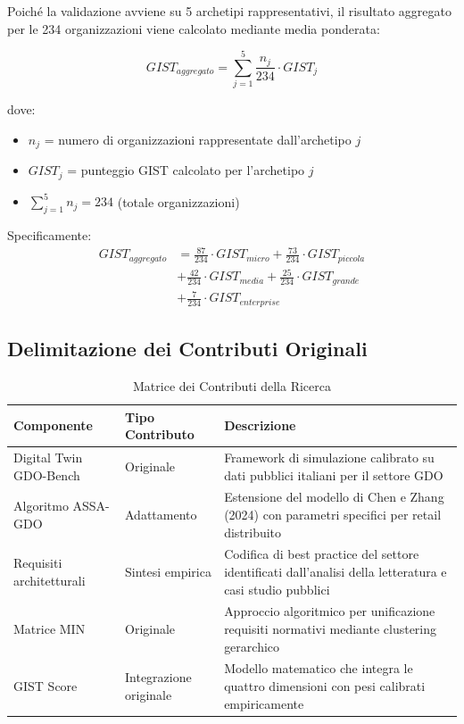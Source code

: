 Poiché la validazione avviene su 5 archetipi rappresentativi, il risultato aggregato per le 234 organizzazioni viene calcolato mediante media ponderata:

\begin{equation}
GIST_{aggregato} = \sum_{j=1}^{5} \frac{n_j}{234} \cdot GIST_j
\label{eq:gist_aggregato}
\end{equation}

dove:
\begin{itemize}
\item $n_j$ = numero di organizzazioni rappresentate dall'archetipo $j$
\item $GIST_j$ = punteggio GIST calcolato per l'archetipo $j$
\item $\sum_{j=1}^{5} n_j = 234$ (totale organizzazioni)
\end{itemize}

Specificamente:
\begin{align}
GIST_{aggregato} &= \frac{87}{234} \cdot GIST_{micro} + \frac{73}{234} \cdot GIST_{piccola} \nonumber \\
&+ \frac{42}{234} \cdot GIST_{media} + \frac{25}{234} \cdot GIST_{grande} \nonumber \\
&+ \frac{7}{234} \cdot GIST_{enterprise}
\label{eq:gist_pesi}
\end{align}

\subsection{Delimitazione dei Contributi Originali}

\begin{table}[h!]
\centering
\caption{Matrice dei Contributi della Ricerca}
\begin{tabular}{|p{3.5cm}|p{3cm}|p{7cm}|}
\hline
\textbf{Componente} & \textbf{Tipo Contributo} & \textbf{Descrizione} \\
\hline
Digital Twin GDO-Bench & Originale & Framework di simulazione calibrato su dati pubblici italiani per il settore GDO \\
\hline
Algoritmo ASSA-GDO & Adattamento & Estensione del modello di Chen e Zhang (2024) con parametri specifici per retail distribuito \\
\hline
Requisiti architetturali & Sintesi empirica & Codifica di best practice del settore identificati dall'analisi della letteratura e casi studio pubblici \\
\hline
Matrice MIN & Originale & Approccio algoritmico per unificazione requisiti normativi mediante clustering gerarchico \\
\hline
GIST Score & Integrazione originale & Modello matematico che integra le quattro dimensioni con pesi calibrati empiricamente \\
\hline
\end{tabular}
\end{table}



